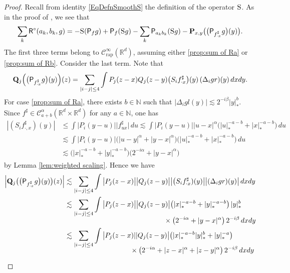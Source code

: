\documentclass[JEP,XML,SOM,Unicode,published]{cedram}
\theoremstyle{plain}
\theoremstyle{definition}
\newcommand{\rap}{\mathrm{rap}}
\newcommand{\bfP}{\mathbf{P}}
\newcommand{\bfQ}{\mathbf{Q}}
\newcommand{\sfP}{\mathsf{P}}
\newcommand{\sfR}{\mathsf{R}}
\newcommand{\bbN}{\mathbb{N}}
\newcommand{\bbR}{\mathbb{R}}
\newcommand{\mcC}{\mathcal{C}}
\begin{document}
\begin{proof}
Recall from identity \eqref{EqDefnSmoothS} the definition of the operator $\textsc{S}$. As in the proof of \cite[Prop.\,10]{BH}, we see that
\begin{align*}
\sum_k \sfR^\circ(a_k,b_k,g) = -\textsc{S}(\sfP_fg) + \sfP_f(\textsc{S} g) - \sum_k\sfP_{a_kb_k}(\textsc{S} g) - \bfP_{x,y}\bigl(\bigl(\sfP_{f_{\cdot x}^\sharp}g\bigr)(y)\bigr).
\end{align*}
The first three terms belong to $\mcC_\rap^\infty(\bbR^d)$, assuming either \eqref{prop:sum of Ra} or \eqref{prop:sum of Rb}. Consider the last term. Note that
\begin{align*}
\bfQ_j\Bigl(\bigl(\sfP_{f_{\cdot x}^\sharp}g\bigr)(y)\Bigr)(z) = \sum_{|i-j|\le4}\int P_j(z-x)Q_j(z-y) \bigl(S_if_{\cdot x}^\sharp\bigr)(y) \,(\Delta_igr)(y)\,dxdy.
\end{align*}
For case \eqref{prop:sum of Ra}, there exists $b\!\in\!\bbN$ such that $|\Delta_igl(y)|\!\lesssim\!2^{-i\beta}|y|_*^b$. Since \hbox{$f^\sharp\!\in\!\mcC_{a+b}^\alpha(\bbR^d\!\times\!\bbR^d)$} for any $a\in\bbN$, one has
\begin{align*}
|(S_if_{\cdot,x}^\sharp)(y)|
&\le\int \big|P_i(y-u)\big| \big|f_{ux}^\sharp\big|\,du
\lesssim \int \big|P_i(y-u)\big| |u-x|^\alpha \bigl(|u|_*^{-a-b}+|x|_*^{-a-b}\bigr)\,du \\
&\lesssim \int \big|P_i(y-u)\big| \bigl(|u-y|^\alpha+|y-x|^\alpha\bigr)\bigl(|u|_*^{-a-b}+|x|_*^{-a-b}\bigr)\,du \\
&\lesssim \bigl(|x|_*^{-a-b}+|y|_*^{-a-b}\bigr)\bigl(2^{-i\alpha}+|y-x|^\alpha\bigr)
\end{align*}
by Lemma \ref{lem:weighted scaling}. Hence we have
\begin{align*}
\Big|\bfQ_j\bigl(\bigl(\sfP_{f_{\cdot x}^\sharp}g\bigr)(y)\bigr)(z)\Big| &\lesssim \sum_{|i-j|\le4}\int \big|P_j(z-x)\big|\big|Q_j(z-y)\big| \big| \bigl(S_if_{\cdot x}^\sharp)(y)\big| \big|(\Delta_igr)(y)\big|\,dxdy \\
&\lesssim \sum_{|i-j|\le4}\int \big|P_j(z-x)\big| \big|Q_j(z-y)\big| \bigl(|x|_*^{-a-b} + |y|_*^{-a-b}\bigr)\,|y|_*^b\\[-5pt]
&\hspace*{5cm}\times\bigl(2^{-i\alpha}+|y-x|^\alpha\bigr)\,2^{-i\beta}\,dxdy \\
&\lesssim\sum_{|i-j|\le4}\int \big|P_j(z-x)||Q_j(z-y)\big| \bigl(|x|_*^{-a-b}|y|_*^b + |y|_*^{-a}\bigr)\\[-7pt]
&\hspace*{3.3cm}\times\bigl(2^{-i\alpha}+|z-x|^\alpha+|z-y|^\alpha\bigr)\,2^{-i\beta}\,dxdy \\[2pt]

\end{align*}
\end{proof}
\end{document}
